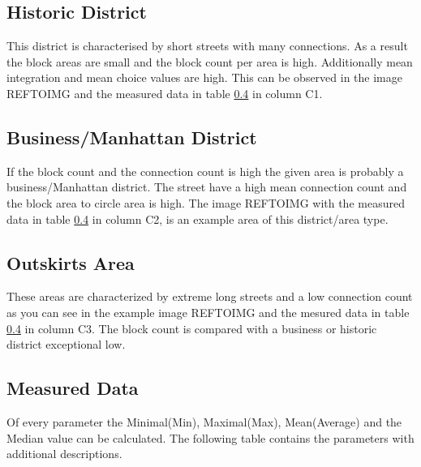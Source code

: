 \documentclass[11pt, a4paper]{report}
\begin{document}
\subsection{Historic District}
\label{sec:historyDistinct}
This district is characterised by short streets with many connections. As a result the block areas are small and the block count per area is high. Additionally mean integration and mean choice values are high. This can be observed in the image REFTOIMG and the measured data in table \ref{sec:ClusterAnalysisMeasurements} in column C1.

\subsection{Business/Manhattan District}
\label{sec:businessDistinct}
If the block count and the connection count is high the given area is probably a business/Manhattan district. The street have a high mean connection count and the block area to circle area is high. The image REFTOIMG with the measured data in table \ref{sec:ClusterAnalysisMeasurements} in column C2, is an example area of this district/area type.

\subsection{Outskirts Area}
\label{sec:outskits}
These areas are characterized by extreme long streets and a low connection count as you can see in the example image REFTOIMG and the mesured data in table \ref{sec:ClusterAnalysisMeasurements} in column C3. The block count is compared with a business or historic district exceptional low.

\subsection{Measured Data}
\label{sec:ClusterAnalysisMeasurements}
Of every parameter the Minimal(Min), Maximal(Max), Mean(Average) and the Median value can be calculated. The following table contains the parameters with additional descriptions.
\end{document}

